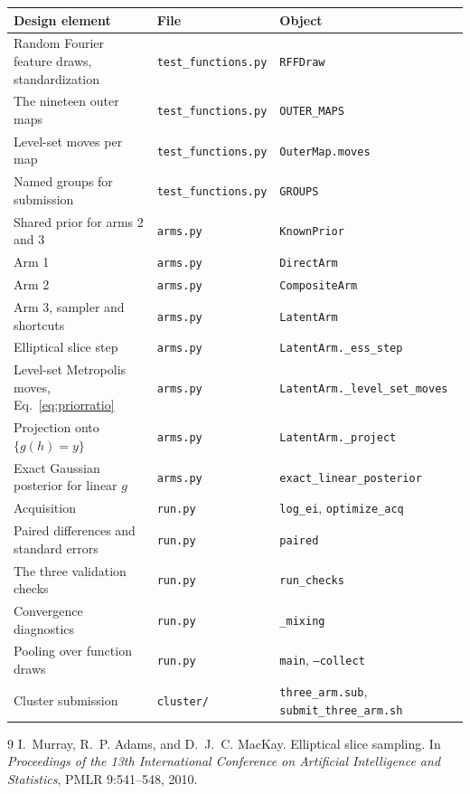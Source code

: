 \documentclass[11pt]{article}
\begin{document}
\begin{center}
\begin{tabular}{lll}
\toprule
Design element & File & Object \\
\midrule
Random Fourier feature draws, standardization & \texttt{test\_functions.py} & \texttt{RFFDraw} \\
The nineteen outer maps & \texttt{test\_functions.py} & \texttt{OUTER\_MAPS} \\
Level-set moves per map & \texttt{test\_functions.py} & \texttt{OuterMap.moves} \\
Named groups for submission & \texttt{test\_functions.py} & \texttt{GROUPS} \\
Shared prior for arms 2 and 3 & \texttt{arms.py} & \texttt{KnownPrior} \\
Arm 1 & \texttt{arms.py} & \texttt{DirectArm} \\
Arm 2 & \texttt{arms.py} & \texttt{CompositeArm} \\
Arm 3, sampler and shortcuts & \texttt{arms.py} & \texttt{LatentArm} \\
Elliptical slice step & \texttt{arms.py} & \texttt{LatentArm.\_ess\_step} \\
Level-set Metropolis moves, Eq.~\eqref{eq:priorratio} & \texttt{arms.py} & \texttt{LatentArm.\_level\_set\_moves} \\
Projection onto $\{g(h)=y\}$ & \texttt{arms.py} & \texttt{LatentArm.\_project} \\
Exact Gaussian posterior for linear $g$ & \texttt{arms.py} & \texttt{exact\_linear\_posterior} \\
Acquisition & \texttt{run.py} & \texttt{log\_ei}, \texttt{optimize\_acq} \\
Paired differences and standard errors & \texttt{run.py} & \texttt{paired} \\
The three validation checks & \texttt{run.py} & \texttt{run\_checks} \\
Convergence diagnostics & \texttt{run.py} & \texttt{\_mixing} \\
Pooling over function draws & \texttt{run.py} & \texttt{main}, \texttt{--collect} \\
Cluster submission & \texttt{cluster/} & \texttt{three\_arm.sub}, \texttt{submit\_three\_arm.sh} \\
\bottomrule
\end{tabular}
\end{center}

\begin{thebibliography}{9}
I.~Murray, R.~P. Adams, and D.~J.~C. MacKay.
Elliptical slice sampling.
In \emph{Proceedings of the 13th International Conference on Artificial
Intelligence and Statistics}, PMLR 9:541--548, 2010.
\end{thebibliography}
\end{document}
